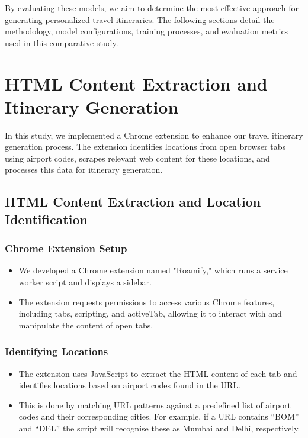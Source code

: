 \documentclass[conference]{IEEEtran}
\begin{document}
    By evaluating these models, we aim to determine the most effective approach for generating personalized travel itineraries. The following sections detail the methodology, model configurations, training processes, and evaluation metrics used in this comparative study.

\section{HTML Content Extraction and Itinerary Generation}

    In this study, we implemented a Chrome extension to enhance our travel itinerary generation process. The extension identifies locations from open browser tabs using airport codes, scrapes relevant web content for these locations, and processes this data for itinerary generation.

    \subsection{HTML Content Extraction and Location Identification}

        \subsubsection{Chrome Extension Setup}
        \begin{itemize}
            \item We developed a Chrome extension named "Roamify," which runs a service worker script and displays a sidebar.
            \item The extension requests permissions to access various Chrome features, including tabs, scripting, and activeTab, allowing it to interact with and manipulate the content of open tabs.
        \end{itemize}
        
        \subsubsection{Identifying Locations}
        \begin{itemize}
            \item The extension uses JavaScript to extract the HTML content of each tab and identifies locations based on airport codes found in the URL.
            \item This is done by matching URL patterns against a predefined list of airport codes and their corresponding cities. For example, if a URL contains “BOM” and “DEL” the script will recognise these as Mumbai and Delhi, respectively.
        \end{itemize}
\end{document}

